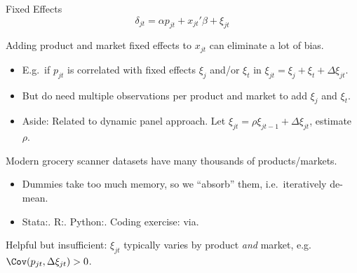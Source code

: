 \documentclass[aspectratio=169,t,11pt,table]{beamer}
\begin{document}
\begin{frame}{Fixed Effects}
    \vspace{-\baselineskip}
    \begin{equation*}
        \delta_{jt} = \alpha p_{jt} + x_{jt}'\beta + \xi_{jt}
    \end{equation*}
    \vspace{-0.5\baselineskip}
    \begin{wideitemize}
        \item Adding product and market fixed effects to $x_{jt}$ can eliminate a lot of bias.
        \begin{itemize}
            \item E.g.\ if $p_{jt}$ is correlated with fixed effects $\xi_j$ and/or $\xi_t$ in $\xi_{jt} = \xi_j + \xi_t + \Delta\xi_{jt}$.
            \item But do need multiple observations per product and market to add $\xi_j$ and $\xi_t$.
            \pause
            \item Aside: Related to dynamic panel approach. Let $\xi_{jt} = \rho \xi_{jt-1} + \Delta\xi_{jt}$, estimate $\rho$.
        \end{itemize}
        \pause
        \item Modern grocery scanner datasets have many thousands of products/markets.
        \begin{itemize}
            \item Dummies take too much memory, so we ``absorb'' them, i.e.\ iteratively de-mean.
            \item Stata:. R:.  Python:. Coding exercise: via.
        \end{itemize}
        \pause
        \item Helpful but insufficient: $\xi_{jt}$ typically varies by product \textit{and} market, e.g.\ $\Cov(p_{jt}, \Delta\xi_{jt}) > 0$.
    \end{wideitemize}
\end{frame}
\end{document}
